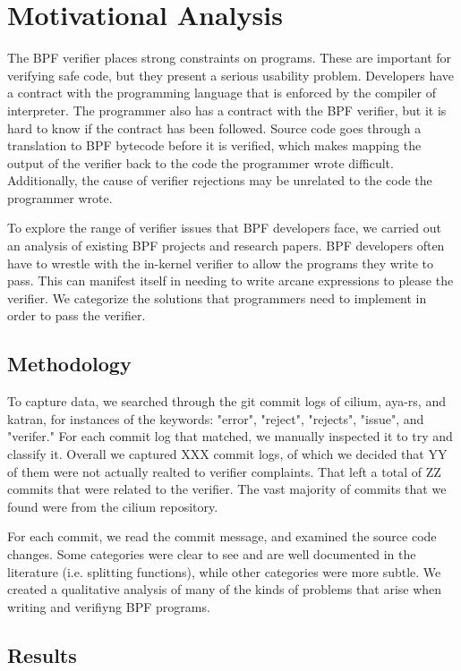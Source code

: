 \section{Motivational Analysis}

The BPF verifier places strong constraints on programs.
These are important for verifying safe code, but they present a serious usability problem.
Developers have a contract with the programming language that is enforced by the compiler of interpreter.
The programmer also has a contract with the BPF verifier, but it is hard to know if the contract has been followed.
Source code goes through a translation to BPF bytecode before it is verified, which makes mapping the output of the verifier back to the code the programmer wrote difficult.
Additionally, the cause of verifier rejections may be unrelated to the code the programmer wrote.

To explore the range of verifier issues that BPF developers face, we carried out an analysis of existing BPF projects and research papers.
BPF developers often have to wrestle with the in-kernel verifier to allow the programs they write to pass.
This can manifest itself in needing to write arcane expressions to please the verifier.
We categorize the solutions that programmers need to implement in order to pass the verifier.

\subsection{Methodology}
To capture data, we searched through the git commit logs of cilium, aya-rs, and katran, for instances of the keywords: "error", "reject", "rejects", "issue", and "verifer." 
For each commit log that matched, we manually inspected it to try and classify it.
Overall we captured XXX commit logs, of which we decided that YY of them were not actually realted to verifier complaints.
That left a total of ZZ commits that were related to the verifier.
The vast majority of commits that we found were from the cilium repository.

For each commit, we read the commit message, and examined the source code changes.
Some categories were clear to see and are well documented in the literature (i.e. splitting functions), while other categories were more subtle.
We created a qualitative analysis of many of the kinds of problems that arise when writing and verifiyng BPF programs.

\subsection{Results}

